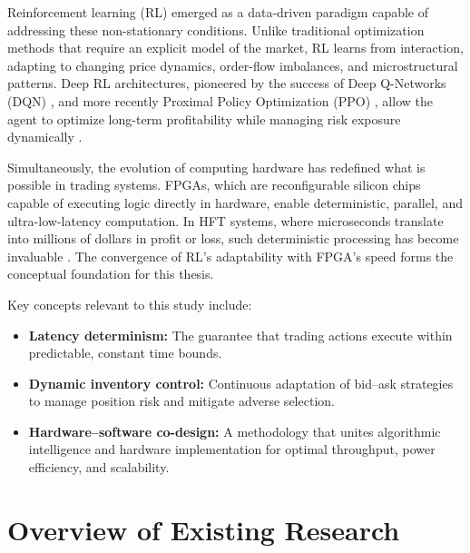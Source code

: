 Reinforcement learning (RL) emerged as a data-driven paradigm capable of addressing these non-stationary conditions. Unlike traditional optimization methods that require an explicit model of the market, RL learns from interaction, adapting to changing price dynamics, order-flow imbalances, and microstructural patterns. Deep RL architectures, pioneered by the success of Deep Q-Networks (DQN) \citep{Mnih2015}, and more recently Proximal Policy Optimization (PPO) \citep{Schulman2017}, allow the agent to optimize long-term profitability while managing risk exposure dynamically \citep{Arulkumaran2017,Spooner2020,Patel2022,Kumar2023,Vakkilainen2023,Ragel2025,Su2025,Jiang2025}. 

Simultaneously, the evolution of computing hardware has redefined what is possible in trading systems. FPGAs, which are reconfigurable silicon chips capable of executing logic directly in hardware, enable deterministic, parallel, and ultra-low-latency computation. In HFT systems, where microseconds translate into millions of dollars in profit or loss, such deterministic processing has become invaluable \citep{Lockwood2012,LitzND,Gupta2024,AlAhmed2024}. The convergence of RL’s adaptability with FPGA’s speed forms the conceptual foundation for this thesis.

Key concepts relevant to this study include:
\begin{itemize}
    \item \textbf{Latency determinism:} The guarantee that trading actions execute within predictable, constant time bounds.
    \item \textbf{Dynamic inventory control:} Continuous adaptation of bid–ask strategies to manage position risk and mitigate adverse selection.
    \item \textbf{Hardware–software co-design:} A methodology that unites algorithmic intelligence and hardware implementation for optimal throughput, power efficiency, and scalability.
\end{itemize}

\section{Overview of Existing Research}
\label{sec:existing_research}

